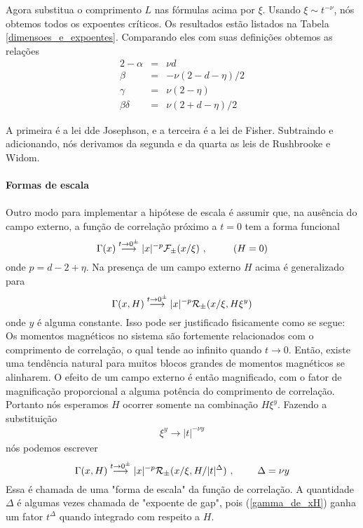 Agora substitua o comprimento $L$ nas fórmulas acima por $\xi$. Usando $\xi \sim t^{-\nu}$, nós obtemos todos os expoentes críticos. Os resultados estão listados na Tabela \ref{dimensoes_e_expoentes}. Comparando eles com suas definições obtemos as relações
\begin{eqnarray}
2-\alpha     &=& \nu d            \nonumber \\
\beta        &=& -\nu(2-d-\eta)/2 \nonumber \\
\gamma       &=& \nu(2-\eta)       \nonumber \\
\beta \delta &=& \nu(2+d-\eta)/2  \nonumber
\end{eqnarray}

A primeira é a lei dde Josephson, e a terceira é a lei de Fisher. Subtraindo e adicionando, nós derivamos da segunda e da quarta as leis de Rushbrooke e Widom.\\
\\
\noindent
{\bf Formas de escala}\\
\\
Outro modo para implementar a hipótese de escala é assumir que, na ausência do campo externo, a função de correlação próximo a $t=0$ tem a forma funcional
\begin{equation}
\Gamma(x)
\stackrel{t\rightarrow0^{\pm}}{\longrightarrow}
|x|^{-p} {\cal F}_{\pm}(x/\xi)~, ~~~~~~~~ (H=0)
\label{gamma_de_x}
\end{equation}
onde $p=d-2+\eta$. Na presença de um campo externo $H$ acima é generalizado para 
\begin{equation}
\Gamma(x,H) \stackrel{t\rightarrow0^{\pm}}{\longrightarrow} |x|^{-p} {\cal R}_{\pm}(x/\xi,H\xi^{y})
\end{equation}
onde $y$ é alguma constante. Isso pode ser justificado fisicamente como se segue: Os momentos magnéticos no sistema são fortemente relacionados com o comprimento de correlação, o qual tende ao infinito quando $t \rightarrow 0$. Então, existe uma tendência natural para muitos blocos grandes de momentos magnéticos se alinharem. O efeito de um campo externo é então magnificado, com o fator de magnificação proporcional a alguma potência do comprimento de correlação. Portanto nós esperamos $H$ ocorrer somente na combinação $H\xi^{y}$. Fazendo a substituição
\begin{eqnarray*}
\xi^{y} \rightarrow |t|^{-\nu y}
\end{eqnarray*}
nós podemos escrever
\begin{equation}
\Gamma(x,H) \stackrel{t\rightarrow0^{\pm}}{\longrightarrow} |x|^{-p} {\cal R}_{\pm}(x/\xi,H/|t|^{\Delta})~, ~~~~~~~\Delta=\nu y
\label{gamma_de_xH}
\end{equation}
Essa é chamada de uma "forma de escala" da função de correlação. A quantidade $\Delta$ é algumas vezes chamada de "expoente de gap", pois (\ref{gamma_de_xH}) ganha um fator $t^{\Delta}$ quando integrado com respeito a $H$.

